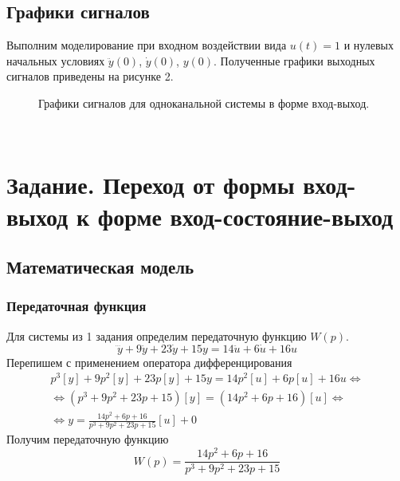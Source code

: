 \documentclass[a5paper, 10pt]{article}
\theoremstyle{definition}
\theoremstyle{plain}
\theoremstyle{remark}
\begin{document}
\newpage
\subsection{Графики сигналов}

Выполним моделирование при входном воздействии вида $u(t)=1$ и нулевых начальных условиях $\ddot{y}(0)$, $\dot{y}(0)$, $y(0)$. Полученные графики выходных сигналов приведены на рисунке 2.

\begin{figure}[h]
\caption{Графики сигналов для одноканальной системы в форме вход-выход.}
\end{figure}

\newpage
\,
\newpage
\section{Задание. Переход от формы вход-выход к форме вход-состояние-выход}
\subsection{Математическая модель}
\subsubsection{Передаточная функция}
Для системы из 1 задания определим передаточную функцию $W(p)$.
\begin{equation}
\dddot{y} + 9\ddot{y} + 23 \dot{y} + 15 y = 14 \ddot{u} + 6 \dot{u} + 16 u
\end{equation}
Перепишем с применением оператора дифференцирования
\begin{multline}
p^3[y] + 9p^2[y] + 23 p[y] + 15 y = 14 p^2[u] + 6 p[u] + 16 u \Leftrightarrow \\
\Leftrightarrow \left( p^3 + 9p^2 + 23 p + 15 \right) [y] = \left( 14 p^2 + 6 p + 16 \right) [u] \Leftrightarrow \\
\Leftrightarrow  y = \frac{14 p^2 + 6 p + 16}{p^3 + 9p^2 + 23 p + 15} [u] + 0
\end{multline}
Получим передаточную функцию
\begin{equation}
W(p) = \frac{14 p^2 + 6 p + 16}{p^3 + 9p^2 + 23 p + 15}
\end{equation}
\end{document}
